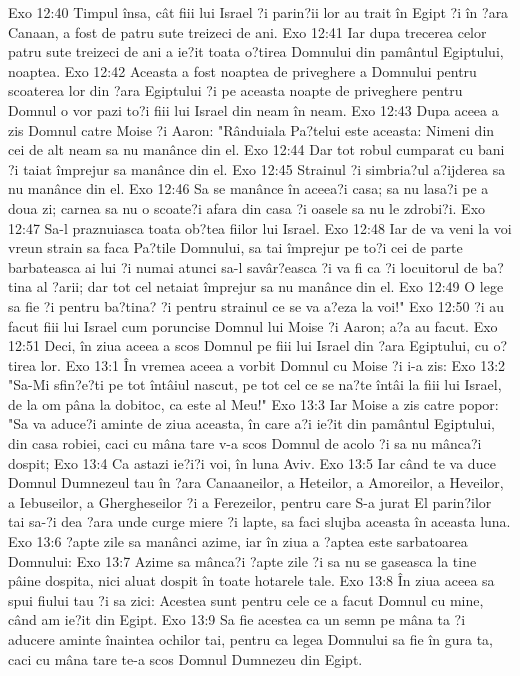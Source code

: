 Exo 12:40  Timpul însa, cât fiii lui Israel ?i parin?ii lor au trait în Egipt ?i în ?ara Canaan, a fost de patru sute treizeci de ani.
Exo 12:41  Iar dupa trecerea celor patru sute treizeci de ani a ie?it toata o?tirea Domnului din pamântul Egiptului, noaptea.
Exo 12:42  Aceasta a fost noaptea de priveghere a Domnului pentru scoaterea lor din ?ara Egiptului ?i pe aceasta noapte de priveghere pentru Domnul o vor pazi to?i fiii lui Israel din neam în neam.
Exo 12:43  Dupa aceea a zis Domnul catre Moise ?i Aaron: "Rânduiala Pa?telui este aceasta: Nimeni din cei de alt neam sa nu manânce din el.
Exo 12:44  Dar tot robul cumparat cu bani ?i taiat împrejur sa manânce din el.
Exo 12:45  Strainul ?i simbria?ul a?ijderea sa nu manânce din el.
Exo 12:46  Sa se manânce în aceea?i casa; sa nu lasa?i pe a doua zi; carnea sa nu o scoate?i afara din casa ?i oasele sa nu le zdrobi?i.
Exo 12:47  Sa-l praznuiasca toata ob?tea fiilor lui Israel.
Exo 12:48  Iar de va veni la voi vreun strain sa faca Pa?tile Domnului, sa tai împrejur pe to?i cei de parte barbateasca ai lui ?i numai atunci sa-l savâr?easca ?i va fi ca ?i locuitorul de ba?tina al ?arii; dar tot cel netaiat împrejur sa nu manânce din el.
Exo 12:49  O lege sa fie ?i pentru ba?tina? ?i pentru strainul ce se va a?eza la voi!"
Exo 12:50  ?i au facut fiii lui Israel cum poruncise Domnul lui Moise ?i Aaron; a?a au facut.
Exo 12:51  Deci, în ziua aceea a scos Domnul pe fiii lui Israel din ?ara Egiptului, cu o?tirea lor.
Exo 13:1  În vremea aceea a vorbit Domnul cu Moise ?i i-a zis:
Exo 13:2  "Sa-Mi sfin?e?ti pe tot întâiul nascut, pe tot cel ce se na?te întâi la fiii lui Israel, de la om pâna la dobitoc, ca este al Meu!"
Exo 13:3  Iar Moise a zis catre popor: "Sa va aduce?i aminte de ziua aceasta, în care a?i ie?it din pamântul Egiptului, din casa robiei, caci cu mâna tare v-a scos Domnul de acolo ?i sa nu mânca?i dospit;
Exo 13:4  Ca astazi ie?i?i voi, în luna Aviv.
Exo 13:5  Iar când te va duce Domnul Dumnezeul tau în ?ara Canaaneilor, a Heteilor, a Amoreilor, a Heveilor, a Iebuseilor, a Ghergheseilor ?i a Ferezeilor, pentru care S-a jurat El parin?ilor tai sa-?i dea ?ara unde curge miere ?i lapte, sa faci slujba aceasta în aceasta luna.
Exo 13:6  ?apte zile sa manânci azime, iar în ziua a ?aptea este sarbatoarea Domnului:
Exo 13:7  Azime sa mânca?i ?apte zile ?i sa nu se gaseasca la tine pâine dospita, nici aluat dospit în toate hotarele tale.
Exo 13:8  În ziua aceea sa spui fiului tau ?i sa zici: Acestea sunt pentru cele ce a facut Domnul cu mine, când am ie?it din Egipt.
Exo 13:9  Sa fie acestea ca un semn pe mâna ta ?i aducere aminte înaintea ochilor tai, pentru ca legea Domnului sa fie în gura ta, caci cu mâna tare te-a scos Domnul Dumnezeu din Egipt.
